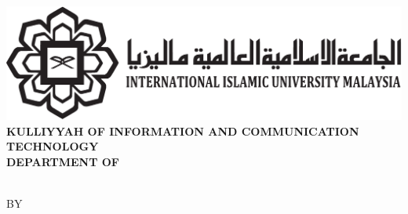 \documentclass[a4paper]{memoir}
\begin{document}
\thispagestyle{empty}
\begin{LARGE}
\begin{center}
\includegraphics[scale=0.5]{../images/iium}\\[24pt]

\textbf{\MakeTextUppercase{Kulliyyah of Information and Communication Technology}\\[24pt]}
\textbf{\MakeTextUppercase{Department of \myDepartment}\\[24pt]}

\MakeTextUppercase{\myTitle}\\
\vfill
BY\\
\vfill
\MakeTextUppercase{\myName}\\
\vfill
\MakeTextUppercase{\myUni}\\
\vfill
\myYear
\end{center}
\end{LARGE}
\end{document}
